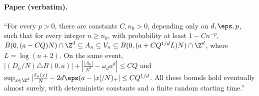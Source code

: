 \paragraph{Paper (verbatim).} ``For every $p>0$, there are constants $C,n_0>0$, depending only on
$d,\eps,p$, such that for every integer $n\geq n_0$, with probability at least $1-Cn^{-p}$,
$B(0,(a-CQ)N)\cap\Z^d\subseteq A_n\subseteq V_n\subseteq B(0,(a+CQ^{1/d}L)N)\cap\Z^d$, where
$L=\log(n+2)$. On the same event, $|(D_n/N)\triangle B(0,a)|+|\frac{|A_n|}{N^d}-\omega_da^d|\leq CQ$ and
$\sup_{x\in\Z^d}|\frac{\ell_n(x)}N-2d\eps(a-|x|/N)_+|\leq CQ^{1/d}$. All these bounds hold eventually
almost surely, with deterministic constants and a finite random starting time.''
